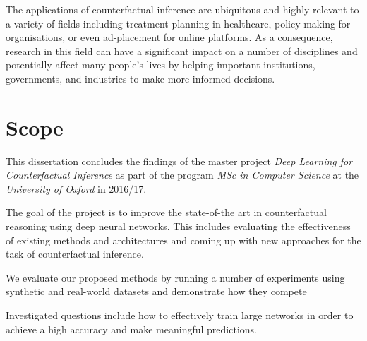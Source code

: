 The applications of counterfactual inference are ubiquitous and highly relevant to a variety of fields including treatment-planning in healthcare, policy-making for organisations, or even ad-placement for online platforms. As a consequence, research in this field can have a significant impact on a number of disciplines and potentially affect many people’s lives by helping important institutions, governments, and industries to make more informed decisions.







\section{Scope}

This dissertation concludes the findings of the master project \emph{Deep Learning for Counterfactual Inference} as part of the program \emph{MSc in Computer Science} at the \emph{University of Oxford} in 2016/17. 

The goal of the project is to improve the state-of-the art in counterfactual reasoning using deep neural networks. This includes evaluating the effectiveness of existing methods and architectures and coming up with new approaches for the task of counterfactual inference.

We evaluate our proposed methods by running a number of experiments using synthetic and real-world datasets and demonstrate how they compete 


Investigated questions include how to effectively train large networks in order to achieve a high accuracy and make meaningful predictions.

